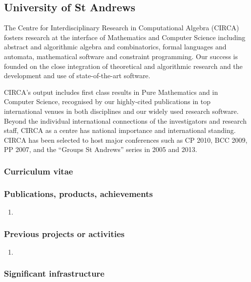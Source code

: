 \subsection*{University of St Andrews}

% 


The Centre for Interdisciplinary Research in Computational Algebra (CIRCA)
fosters research at the interface of Mathematics and Computer Science including
abstract and algorithmic algebra and combinatorics, formal languages and
automata, mathematical software and constraint programming. Our success is 
founded on the close integration of theoretical and algorithmic research and 
the development and use of state-of-the-art software.

CIRCA's output includes first class results in Pure Mathematics and in
Computer Science, recognised by our highly-cited publications in top
international venues in both disciplines and our widely used research
software. Beyond the individual international connections of the 
investigators and research staff, CIRCA as a centre has national 
importance and international standing. CIRCA has been selected to host 
major conferences such as CP 2010, BCC 2009, PP 2007, and the 
``Groups St Andrews'' series in 2005 and 2013.


\subsubsection*{Curriculum vitae}




%

\subsubsection*{Publications, products, achievements}

\begin{enumerate}
\item {}
\end{enumerate}

\subsubsection*{Previous projects or activities}

\begin{enumerate}
\item {}
\end{enumerate}

\subsubsection*{Significant infrastructure}

